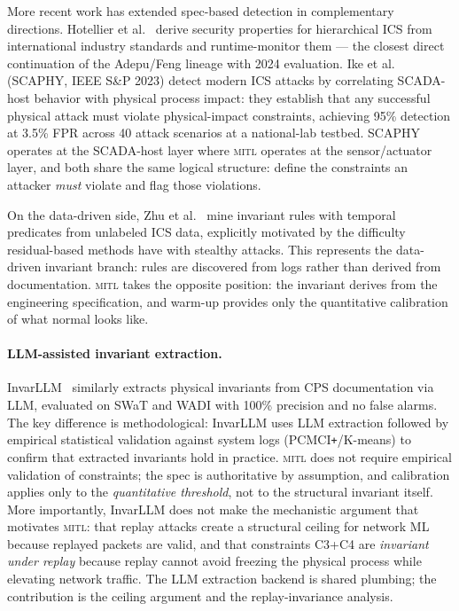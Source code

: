 \documentclass[sigconf,anonymous,review]{acmart}
\newcommand{\mitl}{\textsc{mitl}\xspace}
\begin{document}
More recent work has extended spec-based detection in complementary directions.
Hotellier et al.~\cite{Hotellier2024} derive security properties for
hierarchical ICS from international industry standards and runtime-monitor them
— the closest direct continuation of the Adepu/Feng lineage with 2024
evaluation.  Ike et al.~\cite{SCAPHY2023} (SCAPHY, IEEE S\&P 2023) detect
modern ICS attacks by correlating SCADA-host behavior with physical process
impact: they establish that any successful physical attack must violate
physical-impact constraints, achieving 95\% detection at 3.5\% FPR across
40 attack scenarios at a national-lab testbed.  SCAPHY operates at the
SCADA-host layer where \mitl operates at the sensor/actuator layer, and
both share the same logical structure: define the constraints an attacker
\emph{must} violate and flag those violations.

On the data-driven side, Zhu et al.~\cite{Zhu2025} mine invariant rules with
temporal predicates from unlabeled ICS data, explicitly motivated by the
difficulty residual-based methods have with stealthy attacks.  This represents
the data-driven invariant branch: rules are discovered from logs rather than
derived from documentation.  \mitl takes the opposite position: the invariant
derives from the engineering specification, and warm-up provides only the
quantitative calibration of what normal looks like.

\paragraph{LLM-assisted invariant extraction.}
InvarLLM~\cite{InvarLLM2024} similarly extracts physical invariants from CPS
documentation via LLM, evaluated on SWaT and WADI with 100\% precision and
no false alarms.  The key difference is methodological: InvarLLM uses LLM
extraction followed by empirical statistical validation against system logs
(PCMCI\texttt{+}/K-means) to confirm that extracted invariants hold in
practice.  \mitl does not require empirical validation of constraints; the
spec is authoritative by assumption, and calibration applies only to the
\emph{quantitative threshold}, not to the structural invariant itself.  More
importantly, InvarLLM does not make the mechanistic argument that motivates
\mitl: that replay attacks create a structural ceiling for network ML because
replayed packets are valid, and that constraints C3+C4 are
\emph{invariant under replay} because replay cannot avoid freezing the
physical process while elevating network traffic.  The LLM extraction backend
is shared plumbing; the contribution is the ceiling argument and the
replay-invariance analysis.
\end{document}
